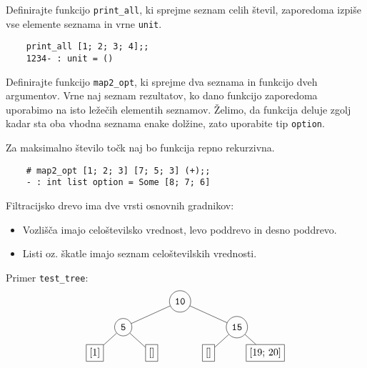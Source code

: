 \documentclass[arhiv]{../izpit}
\begin{document}

\naloga[]

\podnaloga
  Definirajte funkcijo \texttt{print\_all}, ki sprejme seznam celih števil,
  zaporedoma izpiše vse elemente seznama in vrne \texttt{unit}.

  \begin{verbatim}
    print_all [1; 2; 3; 4];;
    1234- : unit = ()
  \end{verbatim}

\podnaloga
  Definirajte funkcijo \texttt{map2\_opt}, ki sprejme dva seznama in funkcijo
  dveh argumentov. Vrne naj seznam rezultatov, ko dano funkcijo zaporedoma
  uporabimo na isto ležečih elementih seznamov. Želimo, da funkcija deluje zgolj
  kadar sta oba vhodna seznama enake dolžine, zato uporabite tip \texttt{option}.

  Za maksimalno število točk naj bo funkcija repno rekurzivna.

  \begin{verbatim}
    # map2_opt [1; 2; 3] [7; 5; 3] (+);;
    - : int list option = Some [8; 7; 6]
  \end{verbatim}


\naloga[]

Filtracijsko drevo ima dve vrsti osnovnih gradnikov:
\begin{itemize}
\item Vozlišča imajo celoštevilsko vrednost, levo poddrevo in desno poddrevo.
\item Listi oz. škatle imajo seznam celoštevilskih vrednosti.
\end{itemize}

\noindent Primer \texttt{test\_tree}:
\[
  \begin{tikzpicture}[level distance=0.9cm,
    level 1/.style={sibling distance=4cm},
    level 2/.style={sibling distance=2cm},
    level 3/.style={sibling distance=2cm}
    ]
    \node[circle, draw] {\texttt{10}}
      child {node[circle, draw] {\texttt{5}}
        child {node[rectangle, draw] {[1]}}
        child {node[rectangle, draw] {[]}}
      }
      child {node[circle, draw] {\texttt{15}}
        child {node[rectangle, draw] {[]}}
        child {node[rectangle, draw] {[19; 20]}}
      };
  \end{tikzpicture}
\]
\end{document}
